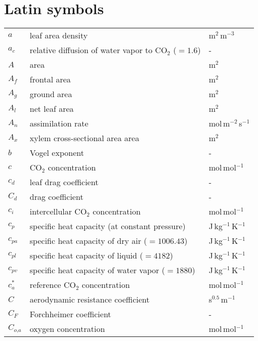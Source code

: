 \section*{Latin symbols}
\begin{longtable}{p{}p{}p{}}
	$a$ & leaf area density & m$^2$\,m$^{-3}$ \\ 	
	$a_c$ & relative diffusion of water vapor to CO$_2$ ($=1.6$) & - \\ 		
	$A$ & area & m$^2$ \\ 		
	$A_f$ & frontal area & m$^2$ \\ 		
	$A_g$ & ground area & m$^2$ \\ 			
	$A_l$ & net leaf area & m$^2$ \\ 			
	$A_n$ & assimilation rate & mol\,m$^{-2}$\,s$^{-1}$ \\ 	
	$A_x$ & xylem cross-sectional area area & m$^2$ \\ 				
	$b$ & Vogel exponent & - \\ 	
	$c$ & CO$_2$ concentration & mol\,mol$^{-1}$ \\ 	
	$c_d$ & leaf drag coefficient & - \\ 	
	$C_d$ & drag coefficient & - \\ 		
	$c_i$ & intercellular CO$_2$ concentration & mol\,mol$^{-1}$ \\ 		
	$c_p$ & specific heat capacity (at constant pressure) & J\,kg$^{-1}$\,K$^{-1}$ \\ 
	$c_{pa}$ & specific heat capacity of dry air ($=\num{1006.43}$) & J\,kg$^{-1}$\,K$^{-1}$ \\ 	
	$c_{pl}$ & specific heat capacity of liquid ($=\num{4182}$) & J\,kg$^{-1}$\,K$^{-1}$ \\ 		
	$c_{pv}$ & specific heat capacity of water vapor ($=\num{1880}$) & J\,kg$^{-1}$\,K$^{-1}$ \\ 			
	$c_a^*$ & reference CO$_2$ concentration & mol\,mol$^{-1}$ \\ 
	$C$ & aerodynamic resistance coefficient & s$^{0.5}$\,m$^{-1}$\\ 
	$C_F$ & Forchheimer coefficient & -\\ 	
	$C_{\textit{o,a}}$ & oxygen concentration & mol\,mol$^{-1}$ \\ 

\end{longtable}
